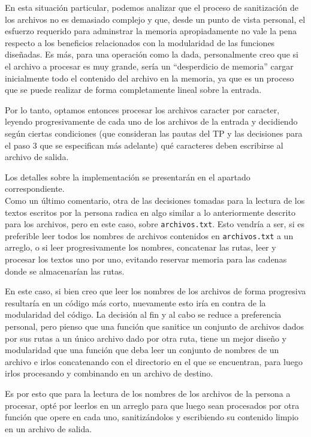 \documentclass[a4paper]{article}
\begin{document}
En esta situación particular, podemos analizar que el proceso de sanitización de los archivos no es demasiado complejo y que, desde un punto de vista personal, el esfuerzo requerido para adminstrar la memoria apropiadamente no vale la pena respecto a los beneficios relacionados con la modularidad de las funciones diseñadas. Es más, para una operación como la dada, personalmente creo que si el archivo a procesar es muy grande, sería un  ``desperdicio de memoria'' cargar inicialmente todo el contenido del archivo en la memoria, ya que es un proceso que se puede realizar de forma completamente lineal sobre la entrada.

Por lo tanto, optamos entonces procesar los archivos caracter por caracter, leyendo progresivamente de cada uno de los archivos de la entrada y decidiendo según ciertas condiciones (que consideran las pautas del TP y las decisiones para el paso 3 que se especifican más adelante) qué caracteres deben escribirse al archivo de salida.

Los detalles sobre la implementación se presentarán en el apartado correspondiente. \\ %

Como un último comentario, otra de las decisiones tomadas para la lectura de los textos escritos por la persona radica en algo similar a lo anteriormente descrito para los archivos, pero en este caso, sobre \texttt{archivos.txt}. Esto vendría a ser, si es preferible leer todos los nombres de archivos contenidos en \texttt{archivos.txt} a un arreglo, o si leer progresivamente los nombres, concatenar las rutas, leer y procesar los textos uno por uno, evitando reservar memoria para las cadenas donde se almacenarían las rutas.

En este caso, si bien creo que leer los nombres de los archivos de forma progresiva resultaría en un código más corto, nuevamente esto iría en contra de la modularidad del código. La decisión al fin y al cabo se reduce a preferencia personal, pero pienso que una función que sanitice un conjunto de archivos dados por sus rutas a un único archivo dado por otra ruta, tiene un mejor diseño y modularidad que una función que deba leer un conjunto de nombres de un archivo e irlos concatenando con el directorio en el que se encuentran, para luego irlos procesando y combinando en un archivo de destino.

Es por esto que para la lectura de los nombres de los archivos de la persona a procesar, opté por leerlos en un arreglo para que luego sean procesados por otra función que opere en cada uno, sanitizándolos y escribiendo su contenido limpio en un archivo de salida.
\end{document}
